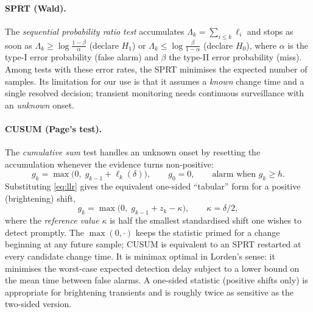 \documentclass[11pt]{article}
\begin{document}
\paragraph{SPRT (Wald).}
The \emph{sequential probability ratio test} accumulates $\Lambda_k=\sum_{i\le k}\ell_i$
and stops as soon as $\Lambda_k\ge \log\frac{1-\beta}{\alpha}$ (declare $H_1$) or
$\Lambda_k\le\log\frac{\beta}{1-\alpha}$ (declare $H_0$), where $\alpha$ is the
type-I error probability (false alarm) and $\beta$ the type-II error probability
(miss). Among tests with these error rates, the SPRT minimises the expected number of
samples. Its limitation for our use is that it assumes a \emph{known} change time and
a single resolved decision; transient monitoring needs continuous surveillance with
an \emph{unknown} onset.

\paragraph{CUSUM (Page's test).}
The \emph{cumulative sum} test handles an unknown onset by resetting the accumulation
whenever the evidence turns non-positive:
\begin{equation}
  g_k = \max\!\big(0,\; g_{k-1}+\ell_k(\delta)\big),\qquad g_0=0,
  \qquad\text{alarm when } g_k\ge h .
  \label{eq:cusum}
\end{equation}
Substituting \eqref{eq:llr} gives the equivalent one-sided ``tabular'' form for a
positive (brightening) shift,
\begin{equation}
  g_k=\max\big(0,\;g_{k-1}+z_k-\kappa\big),\qquad \kappa=\delta/2,
\end{equation}
where the \emph{reference value} $\kappa$ is half the smallest standardised shift one
wishes to detect promptly. The $\max(0,\cdot)$ keeps the statistic primed for a change
beginning at any future sample; CUSUM is equivalent to an SPRT restarted at every
candidate change time. It is minimax optimal in Lorden's sense: it minimises the
worst-case expected detection delay subject to a lower bound on the mean time between
false alarms. A one-sided statistic (positive shifts only) is appropriate for
brightening transients and is roughly twice as sensitive as the two-sided version.
\end{document}
